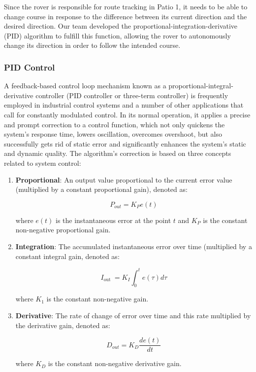 \documentclass[12pt, a4paper, oneside]{report}
\begin{document}
Since the rover is responsible for route tracking in Patio 1, it needs to be able to change course in response to the difference between its current direction and the desired direction. Our team developed the proportional-integration-derivative (PID) algorithm to fulfill this function, allowing the rover to autonomously change its direction in order to follow the intended course.



\subsubsection{PID Control}
A feedback-based control loop mechanism known as a proportional-integral-derivative controller (PID controller or three-term controller) is frequently employed in industrial control systems and a number of other applications that call for constantly modulated control. In its normal operation, it applies a precise and prompt correction to a control function, which not only quickens the system's response time, lowers oscillation, overcomes overshoot, but also successfully gets rid of static error and significantly enhances the system's static and dynamic quality. The algorithm's correction is based on three concepts related to system control:

\begin{enumerate}

\item \textbf{Proportional}: An output value proportional to the current error value (multiplied by a constant proportional gain), denoted as:
\begin{tcolorbox}
$$P_{o u t}=K_P e(t)$$
\end{tcolorbox}
where $e(t)$ is the instantaneous error at the point $t$ and $K_P$ is the constant non-negative proportional gain.
\item \textbf{Integration}: The accumulated instantaneous error over time (multiplied by a constant integral gain, denoted as:
\begin{tcolorbox}
$$I_{\text {out }}=K_I \int_0^t e(\tau) d \tau$$
\end{tcolorbox}
where $K_1$ is the constant non-negative gain. 
\item \textbf{Derivative}: The rate of change of error over time and this rate multiplied by the derivative gain, denoted as:
\begin{tcolorbox}
$$D_{o u t}=K_D \frac{d e(t)}{d t}$$
\end{tcolorbox}
where $K_D$ is the constant non-negative derivative gain.

\end{enumerate}
\end{document}
